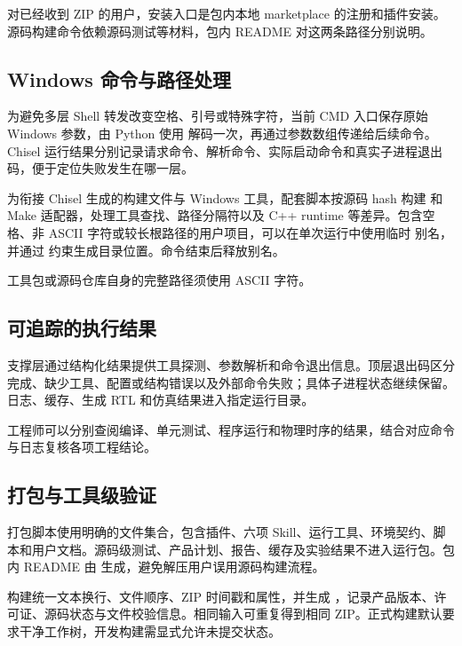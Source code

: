 \documentclass[UTF8,fontset=none,zihao=-4,a4paper]{ctexart}
\begin{document}
对已经收到 ZIP 的用户，安装入口是包内本地 marketplace 的注册和插件安装。源码构建命令依赖源码测试等材料，包内 README 对这两条路径分别说明。

\subsection{Windows 命令与路径处理}

为避免多层 Shell 转发改变空格、引号或特殊字符，当前 CMD 入口保存原始 Windows 参数，由 Python 使用  解码一次，再通过参数数组传递给后续命令。Chisel 运行结果分别记录请求命令、解析命令、实际启动命令和真实子进程退出码，便于定位失败发生在哪一层。

为衔接 Chisel 生成的构建文件与 Windows 工具，配套脚本按源码 hash 构建  和 Make 适配器，处理工具查找、路径分隔符以及 C++ runtime 等差异。包含空格、非 ASCII 字符或较长根路径的用户项目，可以在单次运行中使用临时  别名，并通过  约束生成目录位置。命令结束后释放别名。

工具包或源码仓库自身的完整路径须使用 ASCII 字符。

\subsection{可追踪的执行结果}

支撑层通过结构化结果提供工具探测、参数解析和命令退出信息。顶层退出码区分完成、缺少工具、配置或结构错误以及外部命令失败；具体子进程状态继续保留。日志、缓存、生成 RTL 和仿真结果进入指定运行目录。

工程师可以分别查阅编译、单元测试、程序运行和物理时序的结果，结合对应命令与日志复核各项工程结论。

\subsection{打包与工具级验证}

打包脚本使用明确的文件集合，包含插件、六项 Skill、运行工具、环境契约、脚本和用户文档。源码级测试、产品计划、报告、缓存及实验结果不进入运行包。包内 README 由  生成，避免解压用户误用源码构建流程。

构建统一文本换行、文件顺序、ZIP 时间戳和属性，并生成 ，记录产品版本、许可证、源码状态与文件校验信息。相同输入可重复得到相同 ZIP。正式构建默认要求干净工作树，开发构建需显式允许未提交状态。
\end{document}
